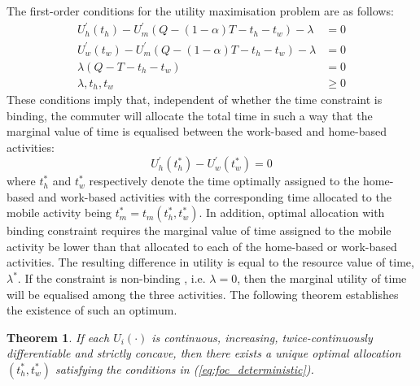\documentclass[12pt,a4paper,british]{article}
\newtheorem{theorem}{Theorem}[section]
\begin{document}

The first-order conditions for the utility maximisation problem are as follows:
\begin{subequations}
\begin{align}
U_{h}^{\prime}\left(t_{h}\right)-U_{m}^{\prime}\left(Q-\left(1-\alpha\right)T-t_{h}-t_{w}\right)-\lambda & =0
\label{eq:foc_deterministic_th} \\
U_{w}^{\prime}\left(t_{w}\right)-U_{m}^{\prime}\left(Q-\left(1-\alpha\right)T-t_{h}-t_{w}\right)-\lambda & =0
\label{eq:foc_deterministic_tw} \\
\lambda\left(Q-T-t_{h}-t_{w}\right) & =0
\label{eq:foc_deterministic_lmd} \\
\lambda,t_{h},t_{w} & \geq 0
\label{eq:foc_deterministic_nonnega}
\end{align}\label{eq:foc_deterministic}
\end{subequations}
These conditions imply that, independent of whether the time constraint is binding, the commuter will allocate the total time in such a way that the marginal value of time is equalised between the work-based and home-based activities:%
\begin{equation}
U_{h}^{\prime}\left(t_{h}^{\ast}\right)-U_{w}^{\prime}\left(t_{w}^{\ast}\right)=0\label{eq:Uh_eq_Uw}
\end{equation}%
where $t_{h}^{\ast}$ and $t_{w}^{\ast}$ respectively denote the time optimally assigned to the home-based and work-based activities with the corresponding time allocated to the mobile activity being $t_{m}^{\ast}=t_{m}\left(t_{h}^{\ast},t_{w}^{\ast}\right)$. In addition, optimal allocation with binding constraint requires the marginal value of time assigned to the mobile activity be lower than that allocated to each of the home-based or work-based activities. The resulting difference in utility is equal to the resource value of time, $\lambda^{\ast}$. If the constraint is non-binding , i.e. $\lambda=0$, then the marginal utility of time will be equalised among the three activities. The following theorem establishes the existence of such an optimum.

\begin{theorem}
\label{thm:optimum_det}
If each $U_{i}\left(\cdot\right)$ is continuous, increasing, twice-continuously differentiable and strictly concave, then there exists a unique optimal allocation $\left( t_{h}^{\ast}, t_{w}^{\ast} \right)$ satisfying the conditions in (\ref{eq:foc_deterministic}).
\end{theorem}
\end{document}
